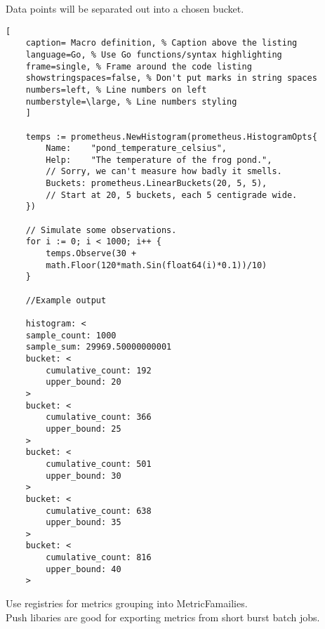 \documentclass[11pt]{scrartcl} %
\begin{document}
Data points will be separated out into a chosen bucket.

\begin{lstlisting}[
	caption= Macro definition, % Caption above the listing
	language=Go, % Use Go functions/syntax highlighting
	frame=single, % Frame around the code listing
	showstringspaces=false, % Don't put marks in string spaces
	numbers=left, % Line numbers on left
	numberstyle=\large, % Line numbers styling
	]

	temps := prometheus.NewHistogram(prometheus.HistogramOpts{
		Name:    "pond_temperature_celsius",
		Help:    "The temperature of the frog pond.", 
		// Sorry, we can't measure how badly it smells.
		Buckets: prometheus.LinearBuckets(20, 5, 5),  
		// Start at 20, 5 buckets, each 5 centigrade wide.
	})

	// Simulate some observations.
	for i := 0; i < 1000; i++ {
		temps.Observe(30 + 
		math.Floor(120*math.Sin(float64(i)*0.1))/10)
	}

	//Example output

	histogram: <
	sample_count: 1000
	sample_sum: 29969.50000000001
	bucket: <
		cumulative_count: 192
		upper_bound: 20
	>
	bucket: <
		cumulative_count: 366
		upper_bound: 25
	>
	bucket: <
		cumulative_count: 501
		upper_bound: 30
	>
	bucket: <
		cumulative_count: 638
		upper_bound: 35
	>
	bucket: <
		cumulative_count: 816
		upper_bound: 40
	>

\end{lstlisting}

Use registries for metrics grouping into MetricFamailies.\\

Push libaries are good for exporting metrics from short burst
batch jobs.




\end{document}
